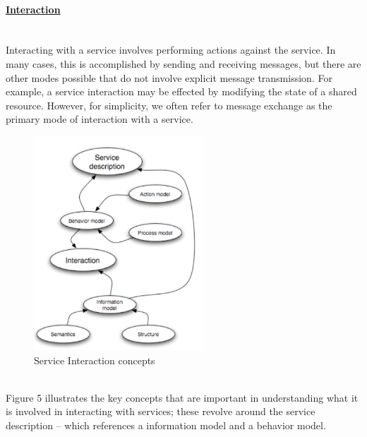 \documentclass[10pt,a4paper]{article}
\newcommand{\myparagraph}[1]{\paragraph{\uline{#1}}\mbox{}\\[0.05in]}
\begin{document}
 \myparagraph{Interaction}
Interacting with a service involves performing actions against the service. In many cases, this is accomplished by sending and receiving messages, but there are other modes possible that do not involve explicit message transmission. For example, a service interaction may be effected by modifying the state of a shared resource. However, for simplicity, we often refer to message exchange as the primary mode of interaction with a service.
\begin{figure}[h!]
 \hfill \includegraphics[width=180pt]{images/interaction}\hspace*{\fill}
  \caption{Service Interaction concepts}
  \label{fig:interaction}
\end{figure}  \\
Figure 5 illustrates the key concepts that are important in understanding what it is involved in interacting with services; these revolve around the service description – which references a information model and a behavior model.
\end{document}
